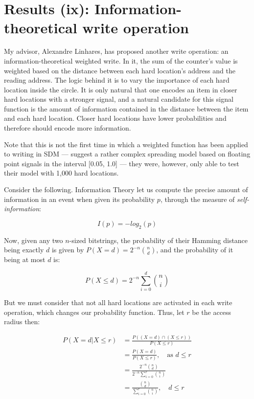 





\chapter{Results (ix): Information-theoretical write operation}


My advisor, Alexandre Linhares, has proposed another write operation: an information-theoretical weighted write. In it, the sum of the counter's value is weighted based on the distance between each hard location's address and the reading address. The logic behind it is to vary the importance of each hard location inside the circle.  It is only natural that one encodes an item in closer hard locations with a stronger signal, and a natural candidate for this signal function is the amount of information contained in the distance between the item and each hard location.  Closer hard locations have lower probabilities and therefore should encode more information.

Note that this is not the first time in which a weighted function has been applied to writing in SDM --- \citet{hely1997new} suggest a rather complex spreading model based on floating point signals in the interval [0.05, 1.0] --- they were, however, only able to test their model with 1,000 hard locations.


Consider the following. Information Theory \citep{cover2012elements} let us compute the precise amount of information in an event when given its probability $p$, through the measure of \emph{self-information}:

$$
I(p)= -log_2(p)
$$

Now, given any two $n$-sized bitstrings, the probability of their Hamming distance being exactly $d$ is given by $P(X=d)= 2^{-n} \binom{n}{d}$, and the probability of it being at most $d$ is:

$$
P(X\leq d)= 2^{-n} {\displaystyle\sum_{i=0}^{d}{\binom{n}{i}}}
$$

But we must consider that not all hard locations are activated in each write operation, which changes our probability function. Thus, let $r$ be the access radius then:

\begin{align*}
P(X = d | X \leq r) &= \frac{P((X = d) \cap (X \leq r))}{P(X \leq r)} \\
    &= \frac{P(X = d)}{P(X \leq r)}, \quad \text{as $d \leq r$} \\
    &= \frac{ 2^{-n} \binom{n}{d} }{ 2^{-n} \sum_{i=0}^{r} \binom{n}{i} } \\
    &= \frac{\binom{n}{d}}{\sum_{i=0}^{r} \binom{n}{i}}, \quad d \leq r
\end{align*}

